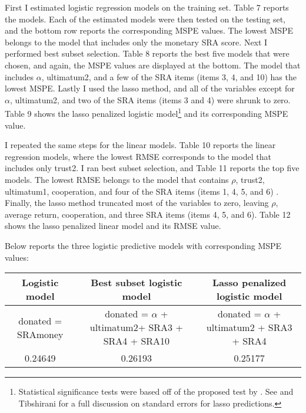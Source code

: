 \documentclass[12pt]{article}
\begin{document}
First I estimated logistic regression models on the training set. Table 7 reports the models. Each of the estimated models were then tested on the testing set, and the bottom row reports the corresponding MSPE values. The lowest MSPE belongs to the model that includes only the monetary SRA score. Next I performed best subset selection. Table 8 reports the best five models that were chosen, and again, the MSPE values are displayed at the bottom. The model that includes \(\alpha\), ultimatum2, and a few of the SRA items (items 3, 4, and 10) has the lowest MSPE. Lastly I used the lasso method, and all of the variables except for \(\alpha\), ultimatum2, and two of the SRA items (items 3 and 4) were shrunk to zero. Table 9 shows the lasso penalized logistic model\footnote{Statistical significance tests were based off of the proposed test by \cite{lockhart_2014}. See \cite{kyung_2010} and Tibshirani for a full discussion on standard errors for lasso predictions.} and its corresponding MSPE value.

I repeated the same steps for the linear models. Table 10 reports the linear regression models, where the lowest RMSE corresponds to the model that includes only trust2. I ran best subset selection, and Table 11 reports the top five models. The lowest RMSE belongs to the model that contains \(\rho\), trust2, ultimatum1, cooperation, and four of the SRA items (items 1, 4, 5, and 6) . Finally, the lasso method truncated most of the variables to zero, leaving \(\rho\), average return, cooperation, and three SRA items (items 4, 5, and 6). Table 12 shows the lasso penalized linear model and its RMSE value.

Below reports the three logistic predictive models with corresponding MSPE values:

\begin{center}
\begin{adjustbox}{width=\textwidth}
\begin{tabular}{ c | c | c }
\hline \hline
Logistic model & Best subset logistic model & Lasso penalized logistic model \\ 
\hline
\small donated = SRAmoney & donated = \(\alpha\) + ultimatum2+ SRA3 + SRA4 + SRA10 & donated = \(\alpha\) + ultimatum2 + SRA3 + SRA4 \\
 \hline
 0.24649 & 0.26193 & 0.25177 \\  
 \hline \hline
\end{tabular}
\end{adjustbox}
\end{center}
 
\end{document}
